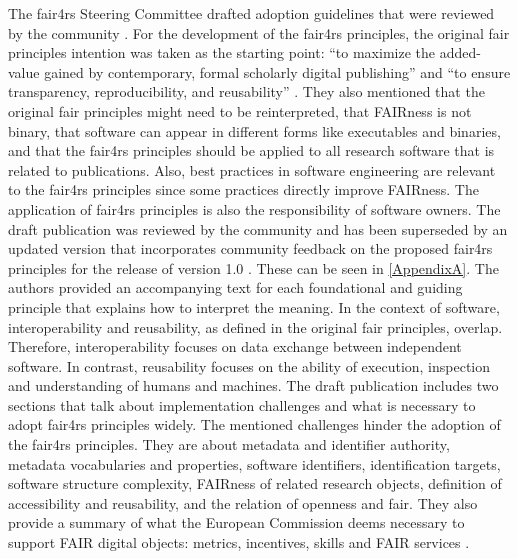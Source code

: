 The \acrshort{fair4rs} Steering Committee drafted adoption guidelines \cite{chue_hong_fair_2021} that were reviewed by the community \cite{chue_hong_fair_2022}. For the development of the \acrshort{fair4rs} principles, the original \acrshort{fair} principles intention was taken as the starting point: “to maximize the added-value gained by contemporary, formal scholarly digital publishing” and “to ensure transparency, reproducibility, and reusability” \cite{wilkinson_fair_2016}. They also mentioned that the original \acrshort{fair} principles might need to be reinterpreted, that FAIRness is not binary, that software can appear in different forms like executables and binaries, and that the \acrshort{fair4rs} principles should be applied to all research software that is related to publications. Also, best practices in software engineering are relevant to the \acrshort{fair4rs} principles since some practices directly improve FAIRness. The application of \acrshort{fair4rs} principles is also the responsibility of software owners. 
The draft publication \cite{chue_hong_fair_2021} was reviewed by the community and has been superseded by an updated version that incorporates community feedback on the proposed \acrshort{fair4rs} principles for the release of version 1.0 \cite{chue_hong_fair_2022}. These can be seen in \autoref{AppendixA}. The authors provided an accompanying text for each foundational and guiding principle that explains how to interpret the meaning. In the context of software, interoperability and reusability, as defined in the original \acrshort{fair} principles, overlap. Therefore, interoperability focuses on data exchange between independent software. In contrast, reusability focuses on the ability of execution, inspection and understanding of humans and machines.
The draft publication includes two sections that talk about implementation challenges and what is necessary to adopt \acrshort{fair4rs} principles widely. The mentioned challenges hinder the adoption of the \acrshort{fair4rs} principles. They are about metadata and identifier authority, metadata vocabularies and properties, software identifiers, identification targets, software structure complexity, FAIRness of related research objects, definition of accessibility and reusability, and the relation of openness and \acrshort{fair}. 
They also provide a summary of what the European Commission deems necessary to support FAIR digital objects: metrics, incentives, skills and FAIR services \cite{directorate-general_for_research_and_innovation_european_commission_turning_2018}.


